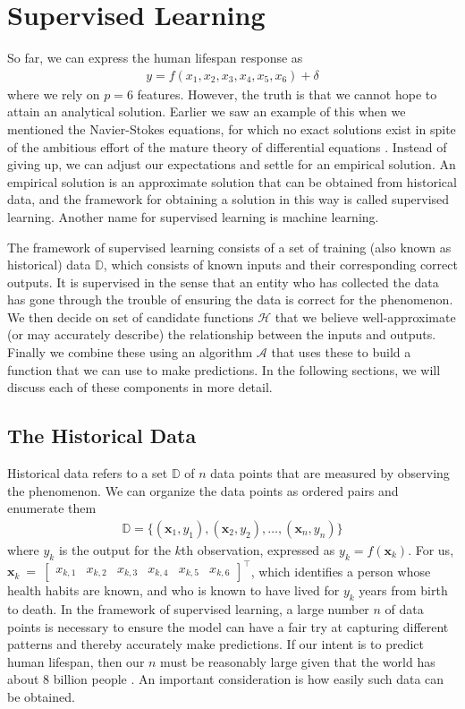 \documentclass[12pt]{article}
\begin{document}
	\section{Supervised Learning}
	So far, we can express the human lifespan response as
	\begin{align*}
		y = f(x_1,x_2,x_3,x_4,x_5, x_6)+\delta
	\end{align*}
	where we rely on $p=6$ features. However, the truth is that we cannot
	hope to attain an analytical solution. Earlier we saw an example of this
	when we mentioned the Navier-Stokes equations, for which no exact solutions exist
	in spite of the ambitious effort of the mature theory of differential equations
	\cite{Clay-navier-stokes}. Instead of giving up, we can adjust our expectations and
	settle for an empirical solution. An empirical solution is an
	approximate solution that can be obtained from historical data, and
	the framework for obtaining a solution in this way is called supervised
	learning. Another name for supervised learning is machine learning.
	
	The framework of supervised learning consists of a set of
	training (also known as historical) data $\mathbb{D}$, which consists of known
	inputs and their corresponding correct outputs. It is supervised in
	the sense that an entity who has collected the data has gone through
	the trouble of ensuring the data is correct for the phenomenon.
	We then decide on set of candidate functions $\mathcal{H}$ that we believe
	well-approximate (or may accurately describe) the relationship between the inputs
	and outputs. Finally we combine these using an algorithm $\mathcal{A}$
	that uses these to build a function that we can use to make predictions.
	In the following sections, we will discuss each of these components in
	more detail.
	\subsection{The Historical Data}
	Historical data refers to a set $\mathbb{D}$ of $n$ data points that are
	measured by observing the phenomenon. We can organize the data points
	as ordered pairs and enumerate them
	\begin{align*}
		\mathbb{D} = \{(\bm{x}_1,y_1), (\bm{x}_2,y_2),\ldots,(\bm{x}_n,y_n)\}
	\end{align*}
	where $y_k$ is the output for the $k$th observation, expressed as $y_k=f(\bm{x}_k)$.
	For us, $\bm{x}_k~=~\begin{bmatrix}
		x_{k,1} & x_{k,2} & x_{k, 3} & x_{k,4} & x_{k,5} & x_{k, 6}
	\end{bmatrix}^\top$, which identifies a person whose health habits are known,
	and who is known to have lived for $y_k$ years from birth to death.
	In the framework of supervised learning, a large number $n$ of data points
	is necessary to ensure the model can have a fair try at capturing different
	patterns and thereby accurately make predictions. If our intent is to predict
	human lifespan, then our $n$ must be reasonably large given that the world has about
	8 billion people \cite{Census-population}. An important consideration is how
	easily such data can be obtained.
	
\end{document}
